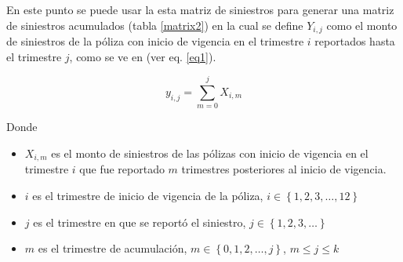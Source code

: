 \documentclass[11pt,twoside,openright,spanish]{report}
\numberwithin{equation}{chapter}
\numberwithin{figure}{chapter}
\numberwithin{table}{chapter}
\begin{document}
	\vspace{1cm}

	En este punto se puede usar la esta matriz de siniestros para generar una matriz de siniestros acumulados (tabla \ref{matrix2}) en la cual se define ${Y}_{i,j}$ como el monto de siniestros de la póliza con inicio de vigencia en el trimestre $i$ reportados hasta el trimestre $j$, como se ve en \citet{PAlvColl} (ver eq. \ref{eq1}).
	
	\begin{equation}
	{y}_{i,j}=\sum _{m=0}^{j}{X}_{i,m}
		\label{eq1}
	\end{equation}

	Donde
	
	\begin{itemize}
	\setlength\itemsep{-0.5em}
		\item ${X}_{i,m}$ es el monto de siniestros de las pólizas con inicio de vigencia en el trimestre $i$ que fue reportado $m$ trimestres posteriores al inicio de vigencia.
		\item $i$ es el trimestre de inicio de vigencia de la póliza, $i\in \left\{1,2,3,\dots ,12\right\}$
		\item $j$ es el trimestre en que se reportó el siniestro,  $j\in \left\{1,2,3,\dots\right\}$
		\item $m$ es el trimestre de acumulación, $m\in \left\{0,1,2,\dots ,j\right\}$, $m\le j\le k$
	\end{itemize} 
	
\end{document}
